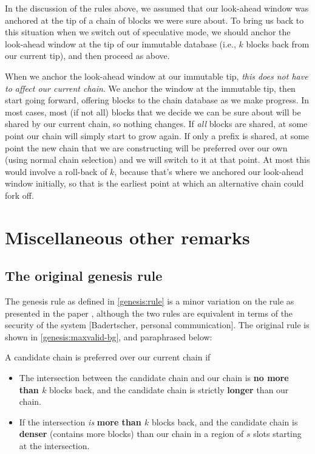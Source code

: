 In the discussion of the rules above, we assumed that our look-ahead window
was anchored at the tip of a chain of blocks we were sure about. To bring us
back to this situation when we switch out of speculative mode, we should
anchor the look-ahead window at the tip of our immutable database (i.e.,
$k$ blocks back from our current tip), and then proceed as above.

When we anchor the look-ahead window at our immutable tip, \emph{this does not
have to affect our current chain}. We anchor the window at the immutable tip,
then start going forward, offering blocks to the chain database as we make
progress. In most cases, most (if not all) blocks that we decide we can be sure
about will be shared by our current chain, so nothing changes. If \emph{all}
blocks are shared, at some point our chain will simply start to grow again. If
only a prefix is shared, at some point the new chain that we are constructing
will be preferred over our own (using normal chain selection) and we will switch
to it at that point. At most this would involve a roll-back of $k$, because
that's where we anchored our look-ahead window initially, so that is the
earliest point at which an alternative chain could fork off.

\section{Miscellaneous other remarks}

\subsection{The original genesis rule}
\label{genesis:original}

The genesis rule as defined in \cref{genesis:rule} is a minor variation on
the rule as presented in the paper \cite{cryptoeprint:2018:378}, although
the two rules are equivalent in terms of the security of the system
[Badertscher, personal communication]. The original rule is shown in
\cref{genesis:maxvalid-bg}, and paraphrased below:

\begin{definition}
\label{genesis:originalrule}
A candidate chain is preferred over our current chain if

\begin{itemize}
\item The intersection between the candidate chain and our chain is \textbf{no
more than $k$} blocks back, and the candidate chain is strictly \textbf{longer}
than our chain.

\item If the intersection \emph{is} \textbf{more than $k$} blocks back, and the
candidate chain is \textbf{denser} (contains more blocks) than our chain in
a region of $s$ slots starting at the intersection.
\end{itemize}
\end{definition}


